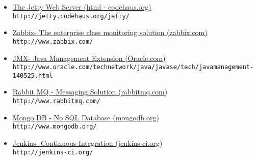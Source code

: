 \begin{itemize}
\item \href{http://jetty.codehaus.org/jetty/}{The Jetty Web Server (html - codehaus.org)}\\
\verb?http://jetty.codehaus.org/jetty/?

\item \href{http://www.zabbix.com/}{Zabbix- The enterprise class monitoring solution (zabbix.com)}\\
\verb?http://www.zabbix.com/?

\item \href{http://www.oracle.com/technetwork/java/javase/tech/javamanagement-140525.html}{JMX- Java Management Extension (Oracle.com)}\\
\verb?http://www.oracle.com/technetwork/java/javase/tech/javamanagement-140525.html?

\item \href{http://www.rabbitmq.com/}{Rabbit MQ - Messaging Solution (rabbitmq.com)}\\
\verb?http://www.rabbitmq.com/?

\item \href{http://www.mongodb.org/}{Mongo DB - No SQL Database (mongodb.org)}\\
\verb?http://www.mongodb.org/?

\item \href{http://jenkins-ci.org/}{Jenkins- Continuous Integration (jenkins-ci.org)}\\
\verb?http://jenkins-ci.org/?
\end{itemize}











